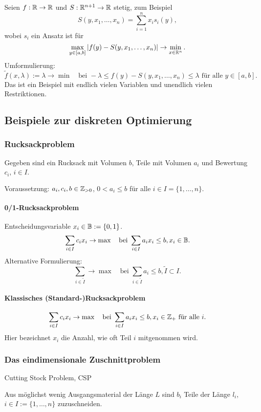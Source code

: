 Seien $f: \mathbb{R} \to \mathbb{R}$ und $S: \mathbb{R}^{n+1} \to \mathbb{R}$ stetig, zum Beispiel
\[ S(y, x_1, \ldots, x_n) = \sum_{i=1}^n x_i s_i(y), \]
wobei $s_i$ ein Ansatz ist für
\[ \max_{y \in [a,b]} | f(y) - S(y, x_1, \ldots, x_n) | \to \min_{x \in
    \mathbb{R}^n}. \]
Umformulierung:
\[ \tilde{f}(x,\lambda) := \lambda \to \min \quad \text{bei } - \lambda \le
  f(y) - S(y, x_1, \ldots, x_n) \le \lambda \text{ für alle } y \in [a,b]. \]
Das ist ein Beispiel mit endlich vielen Variablen und unendlich vielen
Restriktionen.

\subsection{Beispiele zur diskreten Optimierung}
\subsubsection{Rucksackproblem}
Gegeben sind ein Rucksack mit Volumen $b$, Teile mit Volumen $a_i$ und Bewertung
$c_i$, $i \in I$.

Voraussetzung: $a_i, c_i, b \in \mathbb{Z}_{>0}$, $0 < a_i \le b$ für alle $i \in
I = \{1, \ldots, n\}$.

\paragraph{0/1-Rucksackproblem}
Entscheidungsvariable $x_i \in \mathbb{B} := \{0,1\}$.
\[ \sum_{i \in I} c_i x_i \to \max \quad \text{bei } \sum_{i \in I} a_i x_i \le
  b, x_i \in \mathbb{B}. \]
Alternative Formulierung:
\[ \sum_{i \in \tilde{I}} \to \max \quad \text{bei } \sum_{i \in \tilde{I}} a_i
  \le b, \tilde{I} \subset I. \]

\paragraph{Klassisches (Standard-)Rucksackproblem}
\[ \sum_{i \in I} c_i x_i \to \max \quad \text{bei } \sum_{i \in I} a_i x_i \le
  b, x_i \in \mathbb{Z}_+ \text{ für alle } i. \]
Hier bezeichnet $x_i$ die Anzahl, wie oft Teil $i$ mitgenommen wird.

\subsubsection{Das eindimensionale Zuschnittproblem}
Cutting Stock Problem, CSP

Aus möglichst wenig Ausgangsmaterial der Länge $L$ sind $b_i$ Teile der Länge
$l_i$, $i \in I := \{ 1, \ldots, n \}$ zuzuschneiden.

